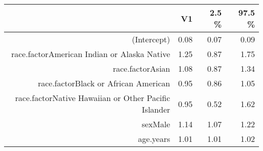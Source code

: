 \begin{table}[ht]
\centering
\begin{tabular}{rrrr}
  \hline
 & V1 & 2.5 \% & 97.5 \% \\ 
  \hline
(Intercept) & 0.08 & 0.07 & 0.09 \\ 
  race.factorAmerican Indian or Alaska Native & 1.25 & 0.87 & 1.75 \\ 
  race.factorAsian & 1.08 & 0.87 & 1.34 \\ 
  race.factorBlack or African American & 0.95 & 0.86 & 1.05 \\ 
  race.factorNative Hawaiian or Other Pacific Islander & 0.95 & 0.52 & 1.62 \\ 
  sexMale & 1.14 & 1.07 & 1.22 \\ 
  age.years & 1.01 & 1.01 & 1.02 \\ 
   \hline
\end{tabular}
\end{table}
